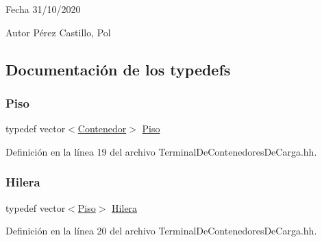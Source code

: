 \begin{DoxyDate}{Fecha}
31/10/2020 
\end{DoxyDate}
\begin{DoxyAuthor}{Autor}
Pérez Castillo, Pol 
\end{DoxyAuthor}


\subsection{Documentación de los \textquotesingle{}typedefs\textquotesingle{}}
\mbox{\label{_terminal_de_contenedores_de_carga_8hh_a07b661e3bf5c0eec5886bbbbeb4e1bc3}} 
\subsubsection{\texorpdfstring{Piso}{Piso}}
{\footnotesize\ttfamily typedef vector$<$\hyperlink{class_contenedor}{Contenedor}$>$ \hyperlink{_terminal_de_contenedores_de_carga_8hh_a07b661e3bf5c0eec5886bbbbeb4e1bc3}{Piso}}



Definición en la línea 19 del archivo Terminal\+De\+Contenedores\+De\+Carga.\+hh.

\mbox{\label{_terminal_de_contenedores_de_carga_8hh_a9575a014a12d19251cec39cff90efa73}} 
\subsubsection{\texorpdfstring{Hilera}{Hilera}}
{\footnotesize\ttfamily typedef vector$<$\hyperlink{_terminal_de_contenedores_de_carga_8hh_a07b661e3bf5c0eec5886bbbbeb4e1bc3}{Piso}$>$ \hyperlink{_terminal_de_contenedores_de_carga_8hh_a9575a014a12d19251cec39cff90efa73}{Hilera}}



Definición en la línea 20 del archivo Terminal\+De\+Contenedores\+De\+Carga.\+hh.

